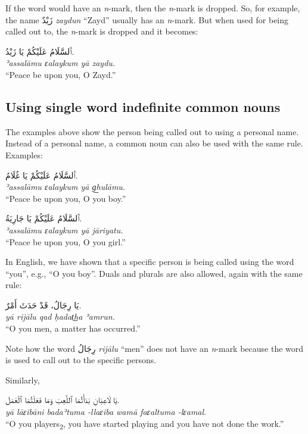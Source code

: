 \documentclass[
  10pt,
]{book}
\begin{document}
If the word would have an \emph{n}-mark, then the \emph{n}-mark is dropped. So, for example, the name \foreignlanguage{arabic}{زَيْدٌ} \emph{zaydun} \enquote{Zayd} usually has an \emph{n}-mark. But when used for being called out to, the \emph{n}-mark is dropped and it becomes:

\foreignlanguage{arabic}{ٱَلسَّلَامُ عَلَيْکُمْ يَا زَيْدُ.}\\
\emph{ʾassalāmu ɛalaykum yā zaydu.}\\
\enquote{Peace be upon you, O Zayd.}

\subsection{Using single word indefinite common nouns}\label{using-single-word-indefinite-common-nouns}

The examples above show the person being called out to using a personal name. Instead of a personal name, a common noun can also be used with the same rule. Examples:

\foreignlanguage{arabic}{ٱَلسَّلَامُ عَلَيْکُمْ يَا غُلَامُ.}\\
\emph{ʾassalāmu ɛalaykum yā g͟hulāmu.}\\
\enquote{Peace be upon you, O you boy.}

\foreignlanguage{arabic}{ٱَلسَّلَامُ عَلَيْکُمْ يَا جَارِيَةُ.}\\
\emph{ʾassalāmu ɛalaykum yā jāriyatu.}\\
\enquote{Peace be upon you, O you girl.}

In English, we have shown that a specific person is being called using the word \enquote{you}, e.g., \enquote{O you boy}. Duals and plurals are also allowed, again with the same rule:

\foreignlanguage{arabic}{يَا رِجَالُ، قَدْ حَدَثَ أَمْرٌ.}\\
\emph{yā rijālu qad ḥadat͟ha ʾamrun.}\\
\enquote{O you men, a matter has occurred.}

Note how the word \foreignlanguage{arabic}{رِجَالُ} \emph{rijālu} \enquote{men} does not have an \emph{n}-mark because the word is used to call out to the specific persons.

Similarly,

\foreignlanguage{arabic}{يَا لَاعِبَانِ بَدَأْتُمَا ٱللَّعِبَ وَمَا فَعَلْتُمَا ٱلْعَمَلَ.}\\
\emph{yā lāɛibāni badaʾtuma -llaɛiba wamā faɛaltuma -lɛamal.}\\
\enquote{O you players\textsubscript{2}, you have started playing and you have not done the work.}
\end{document}
